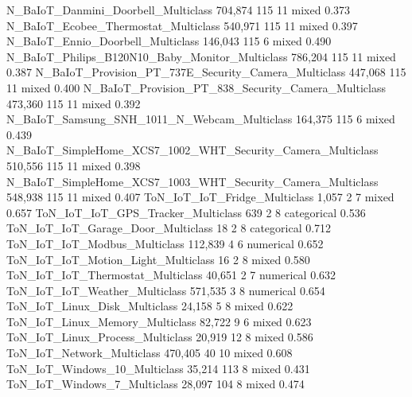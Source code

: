 N_BaIoT_Danmini_Doorbell_Multiclass                                    704,874      115      11         mixed   0.373
N_BaIoT_Ecobee_Thermostat_Multiclass                                   540,971      115      11         mixed   0.397
N_BaIoT_Ennio_Doorbell_Multiclass                                      146,043      115       6         mixed   0.490
N_BaIoT_Philips_B120N10_Baby_Monitor_Multiclass                        786,204      115      11         mixed   0.387
N_BaIoT_Provision_PT_737E_Security_Camera_Multiclass                   447,068      115      11         mixed   0.400
N_BaIoT_Provision_PT_838_Security_Camera_Multiclass                    473,360      115      11         mixed   0.392
N_BaIoT_Samsung_SNH_1011_N_Webcam_Multiclass                           164,375      115       6         mixed   0.439
N_BaIoT_SimpleHome_XCS7_1002_WHT_Security_Camera_Multiclass            510,556      115      11         mixed   0.398
N_BaIoT_SimpleHome_XCS7_1003_WHT_Security_Camera_Multiclass            548,938      115      11         mixed   0.407
ToN_IoT_IoT_Fridge_Multiclass                                            1,057        2       7         mixed   0.657
ToN_IoT_IoT_GPS_Tracker_Multiclass                                         639        2       8   categorical   0.536
ToN_IoT_IoT_Garage_Door_Multiclass                                          18        2       8   categorical   0.712
ToN_IoT_IoT_Modbus_Multiclass                                          112,839        4       6     numerical   0.652
ToN_IoT_IoT_Motion_Light_Multiclass                                         16        2       8         mixed   0.580
ToN_IoT_IoT_Thermostat_Multiclass                                       40,651        2       7     numerical   0.632
ToN_IoT_IoT_Weather_Multiclass                                         571,535        3       8     numerical   0.654
ToN_IoT_Linux_Disk_Multiclass                                           24,158        5       8         mixed   0.622
ToN_IoT_Linux_Memory_Multiclass                                         82,722        9       6         mixed   0.623
ToN_IoT_Linux_Process_Multiclass                                        20,919       12       8         mixed   0.586
ToN_IoT_Network_Multiclass                                             470,405       40      10         mixed   0.608
ToN_IoT_Windows_10_Multiclass                                           35,214      113       8         mixed   0.431
ToN_IoT_Windows_7_Multiclass                                            28,097      104       8         mixed   0.474